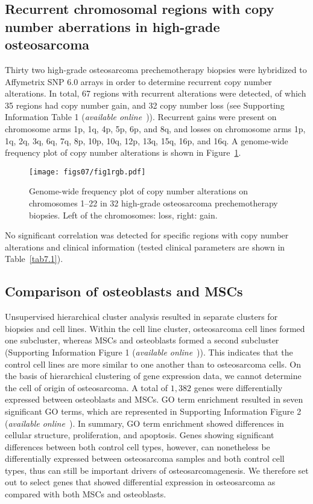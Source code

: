 \subsection{Recurrent chromosomal regions with copy number aberrations in high\hyp{}grade osteosarcoma}
Thirty two high\hyp{}grade osteosarcoma prechemotherapy
biopsies were hybridized to Af\-fy\-met\-rix
SNP 6.0 arrays in order to determine recurrent
copy number alterations. In total, 67 regions with
recurrent alterations were detected, of which 35
regions had copy number gain, and 32 copy number
loss (see Supporting Information Table 1 ({\it available online}~\cite{ch7additional})).
Recurrent gains were present on chromosome
arms 1p, 1q, 4p, 5p, 6p, and 8q, and losses on
chromosome arms 1p, 1q, 2q, 3q, 6q, 7q, 8p, 10p,
10q, 12p, 13q, 15q, 16p, and 16q. A genome\hyp{}wide
frequency plot of copy number alterations is
shown in Figure~\ref{fig7.1}.
%
\begin{figure}[htbp]
	\centering
	\texttt{[image: figs07/fig1rgb.pdf]}	%
	\caption{Genome\hyp{}wide frequency plot of copy number alterations on chromosomes 1--22 in 32 high\hyp{}grade osteosarcoma prechemotherapy biopsies. Left of the chromosomes: loss, right: gain.}
	\label{fig7.1}
\end{figure}
%
No significant correlation was
detected for specific regions with copy number
alterations and clinical information (tested clinical
parameters are shown in Table~\ref{tab7.1}).

\subsection{Comparison of osteoblasts and MSCs}
Unsupervised hierarchical cluster analysis
resulted in separate clusters for biopsies and cell
lines. Within the cell line cluster, osteosarcoma
cell lines formed one subcluster, whereas MSCs
and osteoblasts formed a second subcluster (Supporting
Information Figure 1 ({\it available online}~\cite{ch7additional})). This indicates that
the control cell lines are more similar to one
another than to osteosarcoma cells. On the basis
of hierarchical clustering of gene expression data,
we cannot determine the cell of origin of osteosarcoma.
A total of $1,382$ genes were differentially
expressed between osteoblasts and MSCs. GO
term enrichment resulted in seven significant GO
terms, which are represented in Supporting Information
Figure 2 ({\it available online}~\cite{ch7additional}). In summary, GO term enrichment
showed differences in cellular structure,
proliferation, and apoptosis. Genes showing significant
differences between both control cell
types, however, can nonetheless be differentially
expressed between osteosarcoma samples and
both control cell types, thus can still be important
drivers of osteosarcomagenesis. We therefore set
out to select genes that showed differential
expression in osteosarcoma as compared with
both MSCs and osteoblasts.

